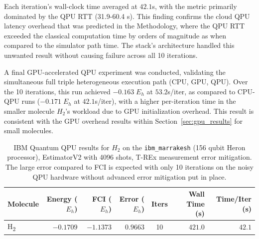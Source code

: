 Each iteration's wall-clock time averaged at $42.1$s, with the metric primarily dominated by the QPU RTT (31.9-60.4 s). This finding confirms 
the cloud QPU latency overhead that was predicted in the Methodology, where the QPU RTT exceeded the classical computation time by 
orders of magnitude as when compared to the simulator path time. The stack's architecture handled this unwanted result without causing failure across all 10 iterations.

A final GPU-accelerated QPU experiment was conducted, validating the simultaneous full triple heterogeneous execution path (CPU, GPU, QPU). Over the 10 iterations, this run achieved $-0.163\;E_h$ at $53.2$s/iter,
as compared to CPU-QPU runs ($-0.171\;E_h$ at $42.1$s/iter), with a higher per-iteration time in the smaller molecule $H_{2}$'s workload due to GPU initialization overhead. This result is consistent with the GPU 
overhead results within Section~\ref{sec:gpu_results} for small molecules.


\begin{table}[htbp]
\centering
\renewcommand{\arraystretch}{1.2}
\caption{IBM Quantum QPU results for $H_{2}$ on the \texttt{ibm\_marrakesh} (156 qubit Heron processor), EstimatorV2 with 4096 shots, T-REx measurement error mitigation. The large error compared to FCI is expected with only 10 iterations on the noisy QPU hardware without advanced error mitigation put in place.}
\label{table:ibm_results}
\begin{tabular}{|l|r|r|r|c|r|r|}
\hline
\textbf{Molecule} & \textbf{Energy ($E_h$)} & \textbf{FCI ($E_h$)} & \textbf{Error ($E_h$)} & \textbf{Iters} & \textbf{Wall Time (s)} & \textbf{Time/Iter (s)} \\ \hline
H\textsubscript{2} & $-0.1709$ & $-1.1373$ & $0.9663$ & 10 & $421.0$ & $42.1$ \\ \hline
\end{tabular}
\end{table}

